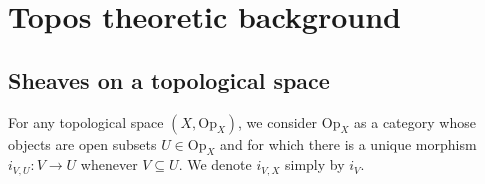 \documentclass[11pt, oneside, article]{memoir}
\theoremstyle{plain}
\theoremstyle{definition}
\theoremstyle{remark}
\newtheorem{example}[theorem]{Example}
\renewcommand{\ss}{\subseteq}
\newcommand{\Set}[1]{\mathrm{#1}}
\newcommand{\wh}[1]{\widehat{#1}}
\newcommand{\Op}{\Set{Op}}
\newcommand{\cpct}[1]{\Set{Cpct}_{#1}}
\newcommand{\pt}{k}				%
\newcommand{\bas}[1]{\wh{#1}}
\begin{document}
\chapter{Topos theoretic background}\label{sec.topos_background}
%
%
%
%
\section{Sheaves on a topological space}

For any topological space $(X,\Op_X)$, we consider $\Op_X$ as a category whose objects are open subsets $U\in\Op_X$ and for which there is a unique morphism $i_{V,U}\colon V\to U$ whenever $V\ss U$. We denote $i_{V,X}$ simply by $i_V$.
\end{document}
